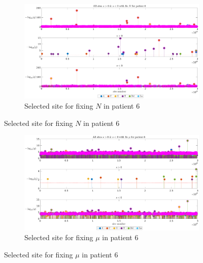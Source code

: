 \documentclass[12pt]{article}
\begin{document}
\begin{figure}[H]
    \ContinuedFloat
    \begin{subfigure}{0.7\textwidth}
    \hspace{-2.5cm}
            \includegraphics[height=0.5\textheight]{figures/patient/pt6/pt6_siteunder_selection_all_fixN.eps}
       
        \caption{Selected site for fixing $N$ in patient 6}
        \label{fig:subfig2}
    \end{subfigure}
    \end{figure}

\begin{figure}[H]
    \ContinuedFloat
    \vspace{1em} 
    
    \begin{subfigure}{0.7\textwidth}
    \hspace{-2.5cm}
            \includegraphics[height=0.5\textheight]{figures/patient/pt6/pt6_siteunder_selection_all_fixmu.eps}
        
        \caption{Selected site for fixing $\mu$ in patient 6}
        \label{fig:subfig3}
    \end{subfigure}
        \end{figure}
\end{document}

